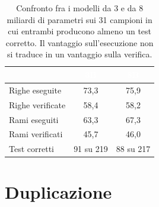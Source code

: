 \begin{table}[H]
\centering
\caption{Confronto fra i modelli da 3 e da 8 miliardi di parametri sui 31
campioni in cui entrambi producono almeno un test corretto. Il vantaggio
sull'esecuzione non si traduce in un vantaggio sulla verifica.}
\label{tab:parita}
\begin{tabular}{lcc}
\hline
\rowcolor{intest}
& \textcolor{white}{\textbf{3B}} & \textcolor{white}{\textbf{8B}} \\
\hline
Righe eseguite    & 73,3 & 75,9 \\
\rowcolor{accento}
Righe verificate  & 58,4 & 58,2 \\
Rami eseguiti     & 63,3 & 67,3 \\
\rowcolor{accento}
Rami verificati   & 45,7 & 46,0 \\
\hline
Test corretti     & 91 su 219 & 88 su 217 \\
\hline
\end{tabular}
\end{table}


\section{Duplicazione}
\label{sec:ris-duplicazione}
%
%
%
%
%


